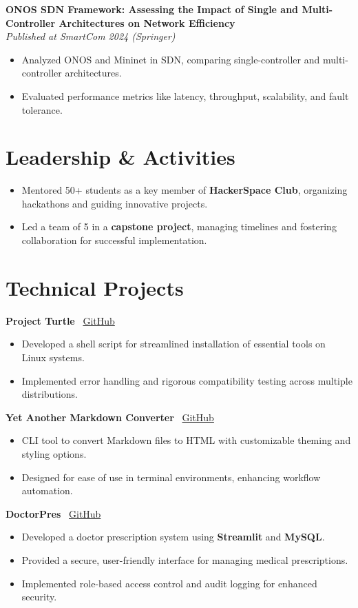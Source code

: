 \documentclass[a4paper,10pt]{article}
\begin{document}
\textbf{ONOS SDN Framework: Assessing the Impact of Single and Multi-Controller Architectures on Network Efficiency}\\
\textit{Published at SmartCom 2024 (Springer)}
\begin{itemize}
    \item Analyzed ONOS and Mininet in SDN, comparing single-controller and multi-controller architectures.
    \item Evaluated performance metrics like latency, throughput, scalability, and fault tolerance.
\end{itemize}

\section*{Leadership \& Activities}
\begin{itemize}
    \item Mentored 50+ students as a key member of \textbf{HackerSpace Club}, organizing hackathons and guiding innovative projects.
    \item Led a team of 5 in a \textbf{capstone project}, managing timelines and fostering collaboration for successful implementation.
\end{itemize}

\section*{Technical Projects}
\textbf{Project Turtle} \hfill \faGithub~\href{https://github.com/AdarshLiju/project-turtle}{GitHub}
\begin{itemize}
    \item Developed a shell script for streamlined installation of essential tools on Linux systems.
    \item Implemented error handling and rigorous compatibility testing across multiple distributions.
\end{itemize}

\textbf{Yet Another Markdown Converter} \hfill \faGithub~\href{https://github.com/AdarshLiju/yamc}{GitHub}
\begin{itemize}
    \item CLI tool to convert Markdown files to HTML with customizable theming and styling options.
    \item Designed for ease of use in terminal environments, enhancing workflow automation.
\end{itemize}

\textbf{DoctorPres} \hfill \faGithub~\href{https://github.com/AdarshLiju/doctorpres}{GitHub}
\begin{itemize}
    \item Developed a doctor prescription system using \textbf{Streamlit} and \textbf{MySQL}.
    \item Provided a secure, user-friendly interface for managing medical prescriptions.
    \item Implemented role-based access control and audit logging for enhanced security.
\end{itemize}
\end{document}
